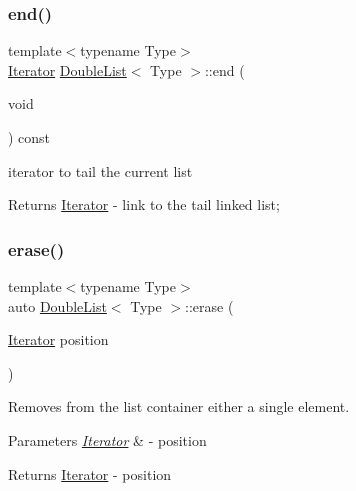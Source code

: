 \subsubsection{\texorpdfstring{end()}{end()}}
{\footnotesize\ttfamily template$<$typename Type$>$ \\
\hyperlink{classDoubleList_1_1Iterator}{Iterator} \hyperlink{classDoubleList}{Double\+List}$<$ Type $>$\+::end (\begin{DoxyParamCaption}\item[{void}]{ }\end{DoxyParamCaption}) const\hspace{0.3cm}{\ttfamily [inline]}}



iterator to tail the current list 

\begin{DoxyReturn}{Returns}
\hyperlink{classDoubleList_1_1Iterator}{Iterator} -\/ link to the tail linked list; 
\end{DoxyReturn}
\mbox{\label{classDoubleList_a4c4e2442340bd76f3f73527012cf21dd}} 
\subsubsection{\texorpdfstring{erase()}{erase()}}
{\footnotesize\ttfamily template$<$typename Type$>$ \\
auto \hyperlink{classDoubleList}{Double\+List}$<$ Type $>$\+::erase (\begin{DoxyParamCaption}\item[{\hyperlink{classDoubleList_1_1Iterator}{Iterator}}]{position }\end{DoxyParamCaption})}



Removes from the list container either a single element. 


\begin{DoxyParams}{Parameters}
{\em \hyperlink{classDoubleList_1_1Iterator}{Iterator}} & -\/ position \\
\hline
\end{DoxyParams}
\begin{DoxyReturn}{Returns}
\hyperlink{classDoubleList_1_1Iterator}{Iterator} -\/ position 
\end{DoxyReturn}
\mbox{\label{classDoubleList_a4fd49f28ae07fd52f6932f21d8604041}} 
